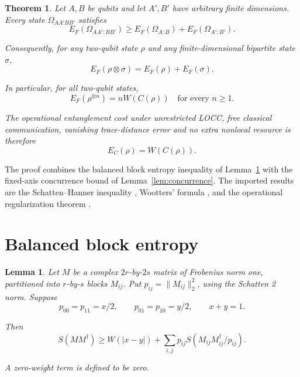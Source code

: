 \documentclass[10pt,letterpaper]{article}
\newtheorem*{theorem}{Theorem}
\newtheorem{lemma}{Lemma}
\begin{document}
\begin{theorem} Let \(A,B\) be qubits and let \(A',B'\) have arbitrary finite dimensions. Every state \(\Omega_{AA'BB'}\) satisfies
\begin{equation}
\boxed{E_F(\Omega_{AA':BB'})\ge E_F(\Omega_{A:B})+E_F(\Omega_{A':B'}).}
\label{eq:1}
\end{equation}

Consequently, for any two-qubit state \(\rho\) and any finite-dimensional bipartite state \(\sigma\),
\begin{equation}
E_F(\rho\otimes\sigma)=E_F(\rho)+E_F(\sigma).
\label{eq:2}
\end{equation}

In particular, for all two-qubit states,
\begin{equation}
\boxed{E_F(\rho^{\otimes n})=nW(C(\rho))\quad\text{for every }n\ge1.}
\label{eq:3}
\end{equation}

The operational entanglement cost under unrestricted LOCC, free classical communication, vanishing trace-distance error and no extra nonlocal resource is therefore
\begin{equation}
\boxed{E_C(\rho)=W(C(\rho)).}
\label{eq:4}
\end{equation}

\end{theorem}

The proof combines the balanced block entropy inequality of Lemma~\ref{lem:entropy} with the fixed-axis concurrence bound of Lemma~\ref{lem:concurrence}. The imported results are the Schatten--Hanner inequality \cite{ref2}, Wootters' formula \cite{ref1}, and the operational regularization theorem \cite{ref3}.

\section{Balanced block entropy}\label{sec:entropy}

\begin{lemma}\label{lem:entropy} Let \(M\) be a complex \(2r\)-by-\(2s\) matrix of Frobenius norm one, partitioned into \(r\)-by-\(s\) blocks \(M_{ij}\). Put \(p_{ij}=\|M_{ij}\|_2^2\), using the Schatten 2 norm. Suppose
\begin{equation*}
p_{00}=p_{11}=x/2,\qquad p_{01}=p_{10}=y/2,\qquad x+y=1.
\end{equation*}

Then
\begin{equation}
S(MM^\dagger)\ge W(|x-y|)+
\sum_{i,j}p_{ij}S(M_{ij}M_{ij}^\dagger/p_{ij}).
\label{eq:5}
\end{equation}

A zero-weight term is defined to be zero.
\end{lemma}
\end{document}
